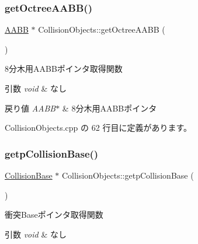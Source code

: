 \mbox{\label{class_collision_objects_a2adc85b2df5c53df2cde2dace2f2d1dd}} 
\subsubsection{\texorpdfstring{get\+Octree\+A\+A\+B\+B()}{getOctreeAABB()}}
{\footnotesize\ttfamily \mbox{\hyperlink{class_a_a_b_b}{A\+A\+BB}} $\ast$ Collision\+Objects\+::get\+Octree\+A\+A\+BB (\begin{DoxyParamCaption}{ }\end{DoxyParamCaption})}



8分木用\+A\+A\+B\+Bポインタ取得関数 


\begin{DoxyParams}{引数}
{\em void} & なし \\
\hline
\end{DoxyParams}

\begin{DoxyRetVals}{戻り値}
{\em A\+A\+B\+B$\ast$} & 8分木用\+A\+A\+B\+Bポインタ \\
\hline
\end{DoxyRetVals}


 Collision\+Objects.\+cpp の 62 行目に定義があります。

\mbox{\label{class_collision_objects_af987979a8d2f976909e4b1e1f3485dd3}} 
\subsubsection{\texorpdfstring{getp\+Collision\+Base()}{getpCollisionBase()}}
{\footnotesize\ttfamily \mbox{\hyperlink{class_collision_base}{Collision\+Base}} $\ast$ Collision\+Objects\+::getp\+Collision\+Base (\begin{DoxyParamCaption}{ }\end{DoxyParamCaption})}



衝突\+Baseポインタ取得関数 


\begin{DoxyParams}{引数}
{\em void} & なし \\
\hline
\end{DoxyParams}

